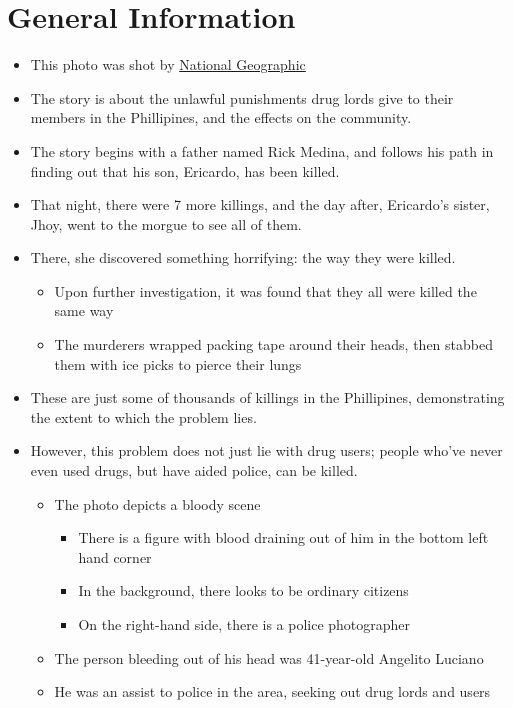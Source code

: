\documentclass[../../main.tex]{subfiles}
\begin{document}
\section{General Information}
\begin{itemize}
    \item This photo was shot by \href{https://www.nationalgeographic.com/photography/proof/2017/02/philippine-drug-war/}{National Geographic}
    \item The story is about the unlawful punishments drug lords give to their members in the Phillipines, and the effects on the community.
    \item The story begins with a father named Rick Medina, and follows his path in finding out that his son, Ericardo, has been killed.
    \item That night, there were 7 more killings, and the day after, Ericardo's sister, Jhoy, went to the morgue to see all of them.
    \item There, she discovered something horrifying: the way they were killed.
    \begin{itemize}
        \item Upon further investigation, it was found that they all were killed the same way
        \item The murderers wrapped packing tape around their heads, then stabbed them with ice picks to pierce their lungs
    \end{itemize}
    \item These are just some of thousands of killings in the Phillipines, demonstrating the extent to which the problem lies.
    \item However, this problem does not just lie with drug users; people who've never even used drugs, but have aided police, can be killed.
    \begin{itemize}
        \item The photo depicts a bloody scene
        \begin{itemize}
            \item There is a figure with blood draining out of him in the bottom left hand corner
            \item In the background, there looks to be ordinary citizens
            \item On the right-hand side, there is a police photographer
        \end{itemize}
        \item The person bleeding out of his head was 41-year-old Angelito Luciano
        \item He was an assist to police in the area, seeking out drug lords and users
    \end{itemize}
\end{itemize}
\end{document}
